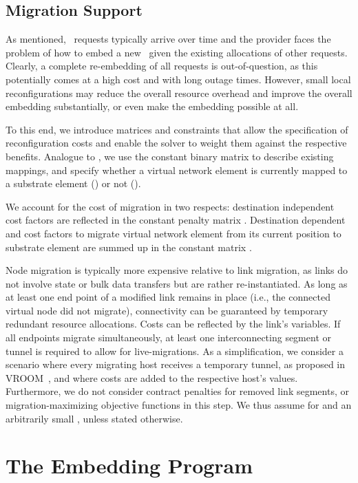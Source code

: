 \documentclass[conference,10pt]{IEEEtran}
\newcommand{\CloudNet}{\text{CloudNet}}
\begin{document}
\subsection{Migration Support} \label{ssec:map:approach:mig}

As mentioned, \CloudNet\ requests typically arrive over time and the provider
faces the problem of how to embed a new \CloudNet\ given the
existing allocations of other requests. Clearly, a complete
re-embedding of all requests is out-of-question, as this potentially
comes at a high cost and with long outage times. However, small
local reconfigurations may reduce the overall resource overhead and
improve the overall embedding substantially, or even make the
embedding possible at all.

To this end, we introduce matrices and constraints
that allow the specification of reconfiguration costs and enable the solver to weight them against the respective benefits.
Analogue to , we use the constant binary matrix  to
describe existing mappings, and
specify whether a virtual network element  is currently mapped
to a substrate element  () or not ().

We account for the cost of migration in two respects: destination
independent cost factors are reflected in the constant penalty
matrix .
Destination dependent  and  cost factors to migrate
virtual network element  from its current position
to substrate element  are summed up in the constant matrix
.

Node migration is typically more expensive relative to
link migration, as links do not involve state or bulk data transfers
but are rather re-instantiated.
As long as at least one end point of a modified link remains in place (i.e., the connected virtual node did not migrate), connectivity can be guaranteed by temporary redundant resource allocations. Costs can be reflected by the link's  variables.
If all endpoints migrate simultaneously, at least one interconnecting segment or tunnel is required to allow for live-migrations.
As a simplification, we consider a scenario where every migrating host receives a temporary tunnel, as proposed in VROOM~\cite{vroom}, and where costs are added to the respective host's  values.
Furthermore, we do not consider contract penalties for removed link segments, or migration-maximizing objective functions in this step.
We thus assume  for  and an arbitrarily small , unless stated otherwise.

\section{The Embedding Program}\label{sec:map:prog}
\end{document}
